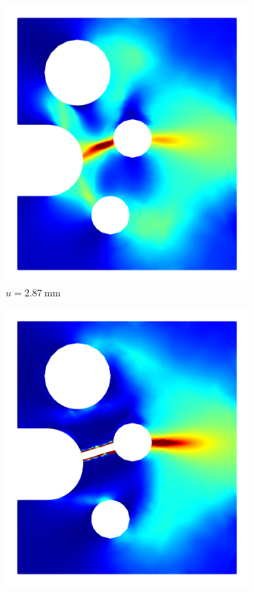 \begin{figure}[!htb]
  \begin{subfigure}{0.17\textwidth}
    \centering
    \includegraphics[width=\textwidth,scale=0.5]{Chapter5/figures/SFC/E_el_1}
    \caption{$u = \SI{2.87}{\milli\meter}$}
    \label{fig: Chapter5/SFC/We_1}
  \end{subfigure}
  \hspace{0.03\textwidth}
  \begin{subfigure}{0.17\textwidth}
    \centering
    \includegraphics[width=\textwidth,scale=0.5]{Chapter5/figures/SFC/E_el_2}

\end{subfigure}
\end{figure}
